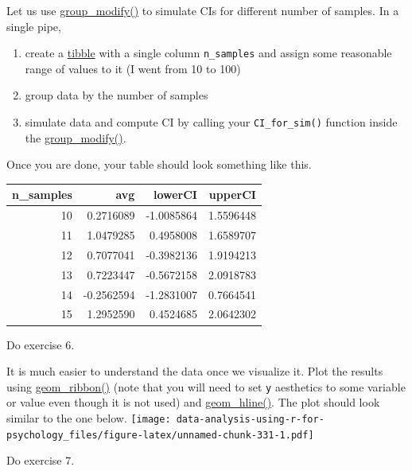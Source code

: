 \documentclass[
]{book}
\providecommand{\tightlist}{%
  \setlength{\itemsep}{0pt}\setlength{\parskip}{0pt}}
\begin{document}
Let us use \href{https://dplyr.tidyverse.org/reference/group_map.html}{group\_modify()} to simulate CIs for different number of samples. In a single pipe,

\begin{enumerate}
\def\labelenumi{\arabic{enumi}.}
\tightlist
\item
  create a \href{https://tibble.tidyverse.org/reference/tibble.html}{tibble} with a single column \texttt{n\_samples} and assign some reasonable range of values to it (I went from 10 to 100)
\item
  group data by the number of samples
\item
  simulate data and compute CI by calling your \texttt{CI\_for\_sim()} function inside the \href{https://dplyr.tidyverse.org/reference/group_map.html}{group\_modify()}.
\end{enumerate}

Once you are done, your table should look something like this.

\begin{tabular}{r|r|r|r}
\hline
n\_samples & avg & lowerCI & upperCI\\
\hline
10 & 0.2716089 & -1.0085864 & 1.5596448\\
\hline
11 & 1.0479285 & 0.4958008 & 1.6589707\\
\hline
12 & 0.7077041 & -0.3982136 & 1.9194213\\
\hline
13 & 0.7223447 & -0.5672158 & 2.0918783\\
\hline
14 & -0.2562594 & -1.2831007 & 0.7664541\\
\hline
15 & 1.2952590 & 0.4524685 & 2.0642302\\
\hline
\end{tabular}

Do exercise 6.

It is much easier to understand the data once we visualize it. Plot the results using \href{https://ggplot2.tidyverse.org/reference/geom_ribbon.html}{geom\_ribbon()} (note that you will need to set \texttt{y} aesthetics to some variable or value even though it is not used) and \href{https://ggplot2.tidyverse.org/reference/geom_abline.html}{geom\_hline()}. The plot should look similar to the one below.
\texttt{[image: data-analysis-using-r-for-psychology\_files/figure-latex/unnamed-chunk-331-1.pdf]}

Do exercise 7.
\end{document}
